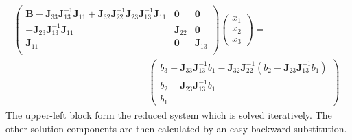\documentclass{report}
\begin{document}
\begin{appendices}
\begin{align}
\begin{pmatrix}
		\mathbf{B} - \mathbf{J}_{33}\mathbf{J}_{13}^{-1}\mathbf{J}_{11} + \mathbf{J}_{32}\mathbf{J}_{22}^{-1}\mathbf{J}_{23}\mathbf{J}_{13}^{-1}\mathbf{J}_{11} & \mathbf{0} & \mathbf{0} \\
		-\mathbf{J}_{23}\mathbf{J}_{13}^{-1}\mathbf{J}_{11} & \mathbf{J}_{22} & \mathbf{0}   \\
		\mathbf{J}_{11} & \mathbf{0} & \mathbf{J}_{13} \\
	\end{pmatrix}\begin{pmatrix}
					x_1 \\ x_2 \\ x_3 
			     \end{pmatrix} =  \qquad\qquad\qquad\qquad\nonumber \\ \qquad\qquad\qquad\qquad\qquad\qquad\qquad
	\begin{pmatrix}
		b_3 - \mathbf{J}_{33}\mathbf{J}_{13}^{-1}b_1 - \mathbf{J}_{32}\mathbf{J}_{22}^{-1}\left(b_2 - \mathbf{J}_{23}\mathbf{J}_{13}^{-1}b_1\right) 
		\\ b_2 - \mathbf{J}_{23}\mathbf{J}_{13}^{-1}b_1 
		\\ b_1 
   	 \end{pmatrix}
	\end{align}
 The upper-left block form the reduced system which is solved iteratively. The other solution components are then calculated by an easy backward substitution.

\end{appendices}



\end{document}

